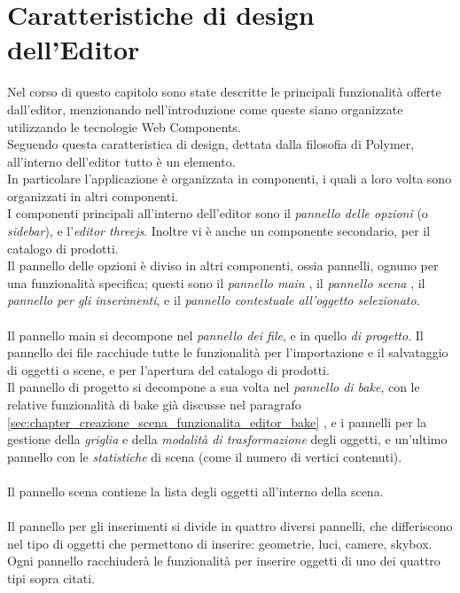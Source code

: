 \section{Caratteristiche di design dell’Editor}
\label{sec:chapter_creazione_scena_design}
Nel corso di questo capitolo sono state descritte le principali funzionalità offerte dall’editor, menzionando nell’introduzione come queste siano organizzate utilizzando le tecnologie Web Components.
\\
Seguendo questa caratteristica di design, dettata dalla filosofia di Polymer, all’interno dell’editor tutto è un elemento.
\\
In particolare l’applicazione è organizzata in componenti, i quali a loro volta sono organizzati in altri componenti.
\\
I componenti principali all'interno dell'editor sono il \emph{pannello delle opzioni} (o \emph{sidebar}), e l’\emph{editor threejs}. Inoltre vi è anche un componente secondario, per il catalogo di prodotti.
\\
Il pannello delle opzioni è diviso in altri componenti, ossia pannelli, ognuno per una funzionalità specifica; questi sono il \emph{pannello main} , il \emph{pannello scena} , il \emph{pannello per gli inserimenti}, e il \emph{pannello contestuale all’oggetto selezionato}.
\\
\\
Il pannello main si decompone nel \emph{pannello dei file}, e in quello \emph{di progetto}. 
Il pannello dei file racchiude tutte le funzionalità per l’importazione e il salvataggio di oggetti o scene, e per l’apertura del catalogo di prodotti.
\\
Il pannello di progetto si decompone a sua volta nel \emph{pannello di bake}, con le relative funzionalità di bake già discusse nel paragrafo \ref{sec:chapter_creazione_scena_funzionalita_editor_bake} , e i pannelli per la gestione della \emph{griglia} e della \emph{modalità di trasformazione} degli oggetti, e un’ultimo pannello con le \emph{statistiche} di scena (come il numero di vertici contenuti).
\\
\\
Il pannello scena contiene la lista degli oggetti all’interno della scena. 
\\
\\
Il pannello per gli inserimenti si divide in quattro diversi pannelli, che differiscono nel tipo di oggetti che permettono di inserire: geometrie, luci, camere, skybox. Ogni pannello racchiuderà le funzionalità per inserire oggetti di uno dei quattro tipi sopra citati.
